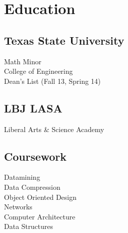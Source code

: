 \documentclass[letterpaper]{resume} %
\begin{document}
\begin{minipage}[t]{0.33\textwidth} %


\section{Education} 

\subsection{Texas State University}
Math Minor \\
College of Engineering \\
Dean's List (Fall 13, Spring 14) \\

\sectionspace %


\subsection{LBJ LASA}
Liberal Arts \& Science Academy \\

\sectionspace %


\subsection{Coursework}

Datamining \\
Data Compression \\
Object Oriented Design \\
Networks \\
Computer Architecture \\
Data Structures

\sectionspace %



\end{minipage}
\end{document}
